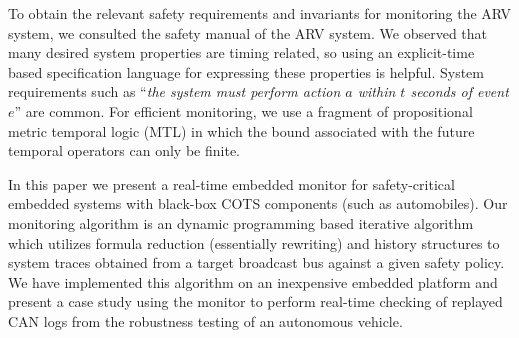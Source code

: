 To obtain the relevant safety requirements and invariants for monitoring the ARV system, we consulted the safety 
manual of the ARV system. We observed that many desired system properties are timing related, so using an explicit-time 
based specification language for expressing these properties is helpful. System requirements such as ``\emph{the system must 
perform action $a$ within $t$ seconds of event $e$}'' are common. For efficient monitoring, we use a fragment of propositional 
metric temporal logic (MTL)\cite{MTL} in which the bound associated with the future temporal operators can only be finite. 


In this paper we present a real-time embedded monitor for safety-critical embedded systems with black-box COTS components (such as automobiles). Our monitoring algorithm \monitor is an dynamic programming based iterative algorithm which utilizes formula reduction (essentially rewriting) and history structures to system traces obtained from a target broadcast bus against a given safety policy. We have implemented this algorithm on an inexpensive embedded platform and present a case study using the monitor to perform real-time checking of replayed CAN logs from the robustness testing of an autonomous vehicle.


